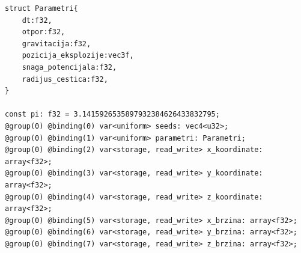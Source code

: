 \documentclass{foi}
\begin{document}
\begin{verbatim}
struct Parametri{
	dt:f32,
	otpor:f32,
	gravitacija:f32,
	pozicija_eksplozije:vec3f,
	snaga_potencijala:f32,
	radijus_cestica:f32,
}

const pi: f32 = 3.1415926535897932384626433832795;
@group(0) @binding(0) var<uniform> seeds: vec4<u32>;
@group(0) @binding(1) var<uniform> parametri: Parametri;
@group(0) @binding(2) var<storage, read_write> x_koordinate: array<f32>;
@group(0) @binding(3) var<storage, read_write> y_koordinate: array<f32>;
@group(0) @binding(4) var<storage, read_write> z_koordinate: array<f32>;
@group(0) @binding(5) var<storage, read_write> x_brzina: array<f32>;
@group(0) @binding(6) var<storage, read_write> y_brzina: array<f32>;
@group(0) @binding(7) var<storage, read_write> z_brzina: array<f32>;
\end{verbatim}
\end{document}
